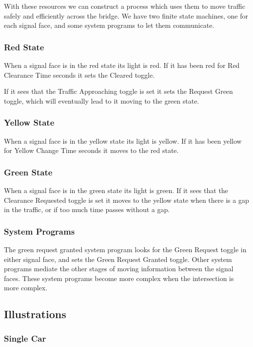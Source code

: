 \documentclass[letterpaper,twoside]{article}
\begin{document}
With these resources we can construct a process which uses them
to move traffic safely and efficiently across the bridge.
We have two finite state machines, one for each signal face,
and some system programs to let them communicate.

\subsubsection{Red State}
When a signal face is in the red state its light is red.  If it has
been red for Red Clearance Time seconds it sets the Cleared toggle.

If it sees that the Traffic Approaching toggle is set it sets
the Request Green toggle, which will eventually lead to it moving
to the green state.

\subsubsection{Yellow State}
When a signal face is in the yellow state its light is yellow.
If it has been yellow for Yellow Change Time seconds it moves
to the red state.

\subsubsection{Green State}
When a signal face is in the green state its light is green.
If it sees that the Clearance Requested toggle is set it moves to the
yellow state when there is a gap in the traffic, or if too much time
passes without a gap.

\subsubsection{System Programs}

The green request granted system program looks for the Green Request
toggle in either signal face, and sets the Green Request Granted
toggle.  Other system programs mediate the other stages of moving
information between the signal faces.  These system programs become
more complex when the intersection is more complex.

\subsection{Illustrations}

\subsubsection{Single Car}
\end{document}
